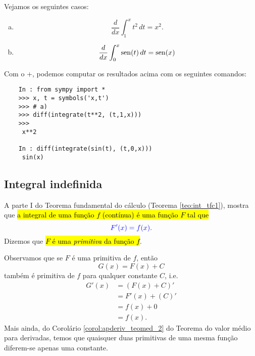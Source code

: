 \begin{ex}
  Vejamos os seguintes casos:
  \begin{enumerate}[a)]
  \item
    \begin{equation}
      \frac{d}{dx}\int_1^x t^2\,dt = x^2.
    \end{equation}
  \item
    \begin{equation}
      \frac{d}{dx}\int_0^x \operatorname{sen}(t)\,dt = \operatorname{sen}(x)
    \end{equation}
  \end{enumerate}

  \ifispython
  Com o {\python}+{\sympy}, podemos computar os resultados acima com os seguintes comandos:
  \begin{lstlisting}
    In : from sympy import *
    >>> x, t = symbols('x,t')
    >>> # a)
    >>> diff(integrate(t**2, (t,1,x)))
    >>> 
     x**2
    
    In : diff(integrate(sin(t), (t,0,x)))
     sin(x)
  \end{lstlisting}
  \fi
\end{ex}

\subsection{Integral indefinida}

A parte I do Teorema fundamental do cálculo (Teorema \ref{teo:int_tfc1}), mostra que \hl{a integral de uma função $f$ (contínua) é uma função $F$ tal que}
\begin{equation}\color{blue}F'(x) = f(x).
\end{equation}
Dizemos que \hl{$F$ é uma \emph{primitiva} da função $f$}.

Observamos que se $F$ é uma primitiva de $f$, então
\begin{equation}
  G(x) = F(x) + C
\end{equation}
também é primitiva de $f$ para qualquer constante $C$, i.e.
\begin{align}
  G'(x) &= (F(x) + C)' \\
        &= F'(x) + (C)' \\
        &= f(x) + 0 \\
        &= f(x).
\end{align}
Mais ainda, do Corolário \ref{corol:apderiv_teomed_2} do Teorema do valor médio para derivadas, temos que quaisquer duas primitivas de uma mesma função diferem-se apenas uma constante.

